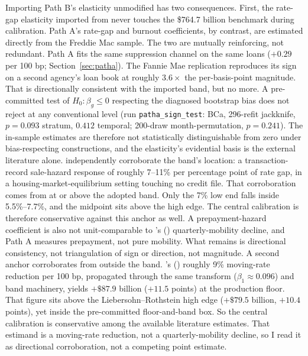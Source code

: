 \documentclass[12pt]{article}
\newcommand{\citepos}[1]{\citeauthor{#1}'s (\citeyear{#1})}
\begin{document}
Importing Path B's elasticity unmodified has two consequences. First, the rate-gap elasticity imported from \citet{liebersohn2024} never touches the \$764.7 billion benchmark during calibration. Path A's rate-gap and burnout coefficients, by contrast, are estimated directly from the Freddie Mac sample. The two are mutually reinforcing, not redundant. Path A fits the same suppression channel on the same loans ($+0.29$ per 100 bp; Section~\ref{sec:patha}). The Fannie Mae replication reproduces its sign on a second agency's loan book at roughly $3.6\times$ the per-basis-point magnitude. That is directionally consistent with the imported band, but no more. A pre-committed test of $H_0\!: \beta_g \le 0$ respecting the diagnosed bootstrap bias does not reject at any conventional level (run \texttt{patha\_sign\_test}: BCa, 296-refit jackknife, $p = 0.093$ stratum, $0.412$ temporal; 200-draw month-permutation, $p = 0.241$). The in-sample estimates are therefore not statistically distinguishable from zero under bias-respecting constructions, and the elasticity's evidential basis is the external literature alone. \citet{graybill2026} independently corroborate the band's location: a transaction-record sale-hazard response of roughly 7--11\% per percentage point of rate gap, in a housing-market-equilibrium setting touching no credit file. That corroboration comes from at or above the adopted band. Only the 7\% low end falls inside 5.5\%--7.7\%, and the midpoint sits above the high edge. The central calibration is therefore conservative against this anchor as well. A prepayment-hazard coefficient is also not unit-comparable to \citepos{liebersohn2024} quarterly-mobility decline, and Path A measures prepayment, not pure mobility. What remains is directional consistency, not triangulation of sign or direction, not magnitude. A second anchor corroborates from outside the band. \citepos{fonseca2024} roughly 9\% moving-rate reduction per 100 bp, propagated through the same transform ($\beta_1 \approx 0.096$) and band machinery, yields $+\$87.9$ billion ($+11.5$ points) at the production floor. That figure sits above the Liebersohn--Rothstein high edge ($+\$79.5$ billion, $+10.4$ points), yet inside the pre-committed floor-and-band box. So the central calibration is conservative among the available literature estimates. That estimand is a moving-rate reduction, not a quarterly-mobility decline, so I read it as directional corroboration, not a competing point estimate.
\end{document}
